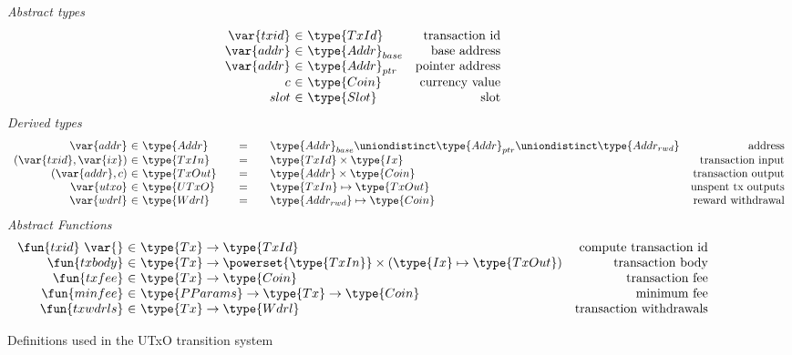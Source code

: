 \documentclass[11pt,a4paper,dvipsnames]{article}
\newcommand{\Tx}{\type{Tx}}
\newcommand{\Ix}{\type{Ix}}
\newcommand{\TxId}{\type{TxId}}
\newcommand{\Addr}{\type{Addr}}
\newcommand{\UTxO}{\type{UTxO}}
\newcommand{\Wdrl}{\type{Wdrl}}
\newcommand{\Coin}{\type{Coin}}
\newcommand{\PParams}{\type{PParams}}
\newcommand{\Slot}{\type{Slot}}
\newcommand{\AddrRWD}{\type{Addr_{rwd}}}
\newcommand{\TxIn}{\type{TxIn}}
\newcommand{\TxOut}{\type{TxOut}}
\newcommand{\txid}[1]{\fun{txid}~ \var{#1}}
\theoremstyle{definition}
\theoremstyle{definition}
\begin{document}
\begin{figure*}
  \emph{Abstract types}
  \begin{equation*}
    \begin{array}{r@{~\in~}lr}
      \var{txid} & \TxId & \text{transaction id}\\
      \var{addr} & \Addr_{base} & \text{base address}\\
      \var{addr} & \Addr_{ptr} & \text{pointer address}\\
      c & \Coin & \text{currency value}\\
      slot & \Slot & \text{slot}
    \end{array}
  \end{equation*}
  \emph{Derived types}
  \begin{equation*}
    \begin{array}{r@{~\in~}l@{\qquad=\qquad}lr}
      \var{addr}
      & \Addr
      & \Addr_{base} \uniondistinct \Addr_{ptr} \uniondistinct \AddrRWD
      & \text{address}\\
      (\var{txid}, \var{ix})
      & \TxIn
      & \TxId \times \Ix
      & \text{transaction input}
      \\
      (\var{addr}, c)
      & \type{TxOut}
      & \Addr \times \Coin
      & \text{transaction output}
      \\
      \var{utxo}
      & \UTxO
      & \TxIn \mapsto \TxOut
      & \text{unspent tx outputs}
      \\
      \var{wdrl}
      & \Wdrl
      & \AddrRWD \mapsto \Coin
      & \text{reward withdrawal}
    \end{array}
  \end{equation*}
  \emph{Abstract Functions}
  \begin{equation*}
    \begin{array}{r@{~\in~}lr}
      \txid{} & \Tx \to \TxId & \text{compute transaction id}\\
      \fun{txbody} & \Tx \to \powerset{\TxIn} \times (\Ix \mapsto \TxOut)
                                  & \text{transaction body}\\
      \fun{txfee} & \Tx \to \Coin & \text{transaction fee}\\
      \fun{minfee} & \PParams \to \Tx \to \Coin & \text{minimum fee}\\
      \fun{txwdrls} & \Tx \to \Wdrl & \text{transaction withdrawals}\\
    \end{array}
  \end{equation*}
  \caption{Definitions used in the UTxO transition system}
  \label{fig:defs:utxo}
\end{figure*}
\end{document}

